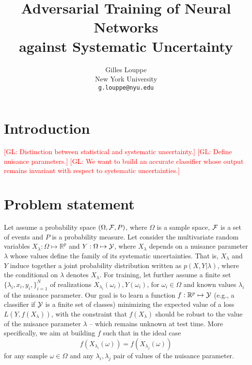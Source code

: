 \documentclass{article}
\title{Adversarial Training of Neural Networks\\
against Systematic Uncertainty}
\author{
  Gilles Louppe \\
  New York University\\
  \texttt{g.louppe@nyu.edu} \\
}
\newcommand{\glnote}[1]{\textcolor{red}{[GL: #1]}}
\theoremstyle{plain}
\begin{document}

\maketitle

\begin{abstract}
\end{abstract}

\section{Introduction}

\glnote{Distinction between statistical and systematic uncertainty.}
\glnote{Define nuisance parameters.}
\glnote{We want to build an accurate classifier whose output remains invariant with
respect to systematic uncertainties.}


\section{Problem statement}
\label{sec:problem}

Let assume a probability space $(\Omega, {\cal F}, P)$, where $\Omega$ is a
sample space, ${\cal F}$ is a set of events and $P$ is a probability measure.
Let consider the multivariate random variables $X_\lambda: \Omega \mapsto
\mathbb{R}^p$ and $Y: \Omega \mapsto {\cal Y}$, where $X_\lambda$ depends on a
nuisance parameter $\lambda$ whose values define the family of its systematic uncertainties.
That is, $X_\lambda$ and $Y$ induce together
a joint probability distribution written as $p(X,Y|\lambda)$, where the
conditional on $\lambda$ denotes $X_\lambda$. For training, let further assume a
finite set $\{ \lambda_i, x_i, y_i, \}_{i=1}^N$ of realizations
$X_{\lambda_i}(\omega_i), Y(\omega_i)$, for $\omega_i \in \Omega$ and known
values $\lambda_i$ of the nuisance parameter. Our goal is to learn a function $f :
\mathbb{R}^p \mapsto {\cal Y}$ (e.g., a classifier if ${\cal Y}$ is a finite set
of classes) minimizing the expected value of a loss $L(Y, f(X_{\lambda}))$, with
the constraint that $f(X_\lambda)$ should be robust to the value of the nuisance
parameter $\lambda$ -- which remains unknown at test time. More specifically, we
aim at building $f$ such that in the ideal case \begin{equation}\label{eqn1}
f(X_{\lambda_i}(\omega)) = f(X_{\lambda_j}(\omega)) \end{equation} for any
sample $\omega \in \Omega$ and any $\lambda_i, \lambda_j$ pair of values of the
nuisance parameter.
\end{document}
